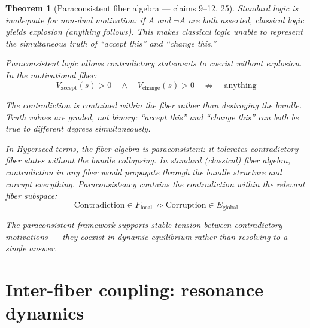 \documentclass[11pt,a4paper]{article}
\newtheorem{theorem}[definition]{Theorem}
\begin{document}
\begin{theorem}[Paraconsistent fiber algebra --- claims 9--12, 25]
\label{thm:paraconsistent}
Standard logic is inadequate for non-dual motivation: if $A$ and $\neg A$
are both asserted, classical logic yields explosion (anything follows).
This makes classical logic unable to represent the simultaneous truth of
``accept this'' and ``change this.''

Paraconsistent logic allows contradictory statements to coexist without
explosion. In the motivational fiber:
\[
  V_{\text{accept}}(s) > 0 \quad \wedge \quad V_{\text{change}}(s) > 0
  \quad \not\Rightarrow \quad \text{anything}
\]

The contradiction is contained within the fiber rather than destroying
the bundle. Truth values are graded, not binary: ``accept this'' and
``change this'' can both be true to different degrees simultaneously.

In Hyperseed terms, the fiber algebra is \emph{paraconsistent}: it
tolerates contradictory fiber states without the bundle collapsing.
In standard (classical) fiber algebra, contradiction in any fiber
would propagate through the bundle structure and corrupt everything.
Paraconsistency contains the contradiction within the relevant fiber
subspace:
\[
  \text{Contradiction} \in F_{\text{local}} \not\Rightarrow
  \text{Corruption} \in E_{\text{global}}
\]

The paraconsistent framework supports stable tension between
contradictory motivations --- they coexist in dynamic equilibrium
rather than resolving to a single answer.
\end{theorem}

\section{Inter-fiber coupling: resonance dynamics}
\label{sec:resonance}
\end{document}
